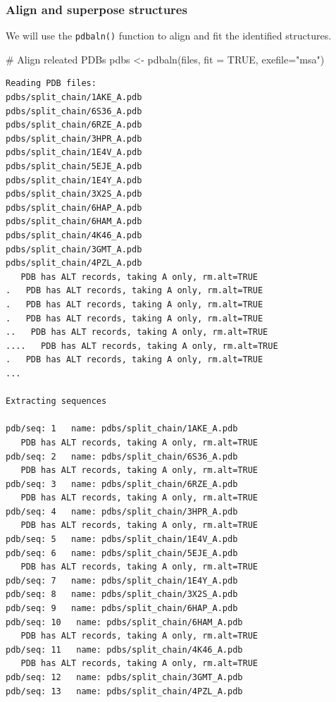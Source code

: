\documentclass[
  letterpaper,
  DIV=11,
  numbers=noendperiod]{scrartcl}
\newenvironment{Shaded}{\begin{snugshade}}{\end{snugshade}}
\newcommand{\AttributeTok}[1]{\textcolor[rgb]{0.40,0.45,0.13}{#1}}
\newcommand{\CommentTok}[1]{\textcolor[rgb]{0.37,0.37,0.37}{#1}}
\newcommand{\ConstantTok}[1]{\textcolor[rgb]{0.56,0.35,0.01}{#1}}
\newcommand{\FunctionTok}[1]{\textcolor[rgb]{0.28,0.35,0.67}{#1}}
\newcommand{\NormalTok}[1]{\textcolor[rgb]{0.00,0.23,0.31}{#1}}
\newcommand{\OtherTok}[1]{\textcolor[rgb]{0.00,0.23,0.31}{#1}}
\newcommand{\StringTok}[1]{\textcolor[rgb]{0.13,0.47,0.30}{#1}}
\begin{document}
\hypertarget{align-and-superpose-structures}{%
\subsubsection{Align and superpose
structures}\label{align-and-superpose-structures}}

We will use the \texttt{pdbaln()} function to align and fit the
identified structures.

\begin{Shaded}
\begin{Highlighting}[]
\CommentTok{\# Align releated PDBs}
\NormalTok{pdbs }\OtherTok{\textless{}{-}} \FunctionTok{pdbaln}\NormalTok{(files, }\AttributeTok{fit =} \ConstantTok{TRUE}\NormalTok{, }\AttributeTok{exefile=}\StringTok{"msa"}\NormalTok{)}
\end{Highlighting}
\end{Shaded}

\begin{verbatim}
Reading PDB files:
pdbs/split_chain/1AKE_A.pdb
pdbs/split_chain/6S36_A.pdb
pdbs/split_chain/6RZE_A.pdb
pdbs/split_chain/3HPR_A.pdb
pdbs/split_chain/1E4V_A.pdb
pdbs/split_chain/5EJE_A.pdb
pdbs/split_chain/1E4Y_A.pdb
pdbs/split_chain/3X2S_A.pdb
pdbs/split_chain/6HAP_A.pdb
pdbs/split_chain/6HAM_A.pdb
pdbs/split_chain/4K46_A.pdb
pdbs/split_chain/3GMT_A.pdb
pdbs/split_chain/4PZL_A.pdb
   PDB has ALT records, taking A only, rm.alt=TRUE
.   PDB has ALT records, taking A only, rm.alt=TRUE
.   PDB has ALT records, taking A only, rm.alt=TRUE
.   PDB has ALT records, taking A only, rm.alt=TRUE
..   PDB has ALT records, taking A only, rm.alt=TRUE
....   PDB has ALT records, taking A only, rm.alt=TRUE
.   PDB has ALT records, taking A only, rm.alt=TRUE
...

Extracting sequences

pdb/seq: 1   name: pdbs/split_chain/1AKE_A.pdb 
   PDB has ALT records, taking A only, rm.alt=TRUE
pdb/seq: 2   name: pdbs/split_chain/6S36_A.pdb 
   PDB has ALT records, taking A only, rm.alt=TRUE
pdb/seq: 3   name: pdbs/split_chain/6RZE_A.pdb 
   PDB has ALT records, taking A only, rm.alt=TRUE
pdb/seq: 4   name: pdbs/split_chain/3HPR_A.pdb 
   PDB has ALT records, taking A only, rm.alt=TRUE
pdb/seq: 5   name: pdbs/split_chain/1E4V_A.pdb 
pdb/seq: 6   name: pdbs/split_chain/5EJE_A.pdb 
   PDB has ALT records, taking A only, rm.alt=TRUE
pdb/seq: 7   name: pdbs/split_chain/1E4Y_A.pdb 
pdb/seq: 8   name: pdbs/split_chain/3X2S_A.pdb 
pdb/seq: 9   name: pdbs/split_chain/6HAP_A.pdb 
pdb/seq: 10   name: pdbs/split_chain/6HAM_A.pdb 
   PDB has ALT records, taking A only, rm.alt=TRUE
pdb/seq: 11   name: pdbs/split_chain/4K46_A.pdb 
   PDB has ALT records, taking A only, rm.alt=TRUE
pdb/seq: 12   name: pdbs/split_chain/3GMT_A.pdb 
pdb/seq: 13   name: pdbs/split_chain/4PZL_A.pdb 
\end{verbatim}
\end{document}
